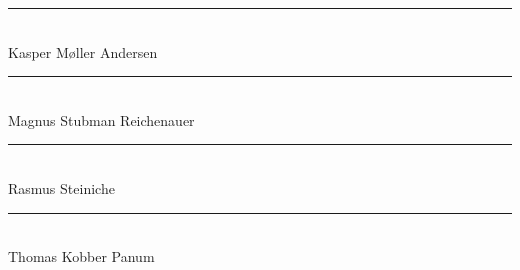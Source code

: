 \newpage
\parbox{10px}{}
\vfill


\begin{flushright}
	\rule[-0.1cm]{7cm}{0.01cm}\\
	Kasper Møller Andersen \\
\end{flushright}

\begin{flushright}
	\rule[-0.1cm]{7cm}{0.01cm}\\
	Magnus Stubman Reichenauer \\
\end{flushright}

\begin{flushright}
	\rule[-0.1cm]{7cm}{0.01cm}\\
	Rasmus Steiniche \\
\end{flushright}

\begin{flushright}
	\rule[-0.1cm]{7cm}{0.01cm}\\
	Thomas Kobber Panum\\
\end{flushright}
